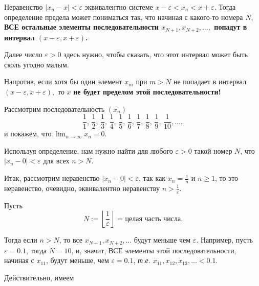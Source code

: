 \begin{comments}
  Неравенство $|x_n-x|<\varepsilon$ эквивалентно системе $x-\varepsilon <x_n < x+ \varepsilon$. Тогда определение предела может пониматься так, что начиная с какого-то номера $N$, \textbf{ВСЕ остальные элементы последовательности $x_{N+1}, x_{N+2}, \ldots,$ попадут в интервал $(x-\varepsilon, x+\varepsilon)$.}

  Далее число $\varepsilon>0$ здесь нужно, чтобы сказать, что этот интервал может быть сколь угодно малым.

  Напротив, если хотя бы один элемент $x_m$ при $m>N$ не попадает в интервал $(x-\varepsilon, x+\varepsilon),$ то $x$ \textbf{не будет пределом этой последовательности!}
\end{comments}

\begin{example}
    Рассмотрим последовательность $(x_n)$
    \[
      \frac{1}{1}, \,\frac{1}{2}, \,\frac{1}{3}, \, \frac{1}{4}, \, \frac{1}{5}, \, \frac{1}{6},\, \frac{1}{7},\, \frac{1}{8},\, \frac{1}{9},\, \frac{1}{10},  \ldots,
    \]
  и покажем, что $\lim_{n \to \infty} x_n = 0$.

 Используя определение, нам нужно найти для любого $\varepsilon >0$ такой номер $N$, что $|x_n - 0| < \varepsilon$ для всех $n>N$.

Итак, рассмотрим неравенство $|x_n - 0| < \varepsilon$, так как $x_n = \frac{1}{n}$ и $n\ge 1$, то это неравенство, очевидно, эквивалентно неравенству $n > \frac{1}{\varepsilon}$.

Пусть
\[
 N := \left\lfloor \frac{1}{\varepsilon} \right\rfloor \mbox{ = целая часть числа.}
\]

Тогда если $n>N$, то все $x_{N+1}, x_{N+2}, \ldots $ будут меньше чем $\varepsilon.$ Например, пусть $\varepsilon = 0.1$, тогда $N = 10$, и, значит, ВСЕ элементы этой последовательности, начиная с $x_{11}$, будут меньше, чем $\varepsilon = 0.1$, \textit{т.е.} $x_{11}, x_{12}, x_{13}, \ldots < 0.1$.

Действительно, имеем


\end{example}
